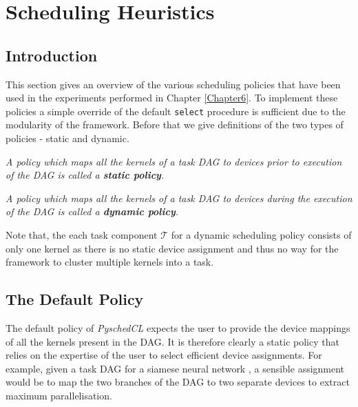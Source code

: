 
\chapter{Scheduling Heuristics} %

\label{Chapter5} %



\section{Introduction}
This section gives an overview of the various scheduling policies that have been used in the experiments performed in Chapter \ref{Chapter6}. To implement these policies a simple override of the default {\tt select} procedure is sufficient due to the modularity of the framework. Before that we give definitions of the two types of policies - static and dynamic. 

\begin{definition}
    \emph{A policy which maps all the kernels of a task DAG to devices prior to execution of the DAG is called a \textbf{static policy}.} 
\end{definition}
\begin{definition}
    \emph{A policy which maps all the kernels of a task DAG to devices during the execution of the DAG is called a \textbf{dynamic policy}.} 
\end{definition}

Note that, the each task component $\mathcal{T}$ for a dynamic scheduling policy consists of only one kernel as there is no static device assignment and thus no way for the framework to cluster multiple kernels into a task.

\section{The Default Policy}
The default policy of \emph{PyschedCL} expects the user to provide the device mappings of all the kernels present in the DAG. It is therefore clearly a static policy that relies on the expertise of the user to select efficient device assignments. For example, given a task DAG for a siamese neural network \cite{siamese}, a sensible assignment would be to map the two branches of the DAG to two separate devices to extract maximum parallelisation.  


